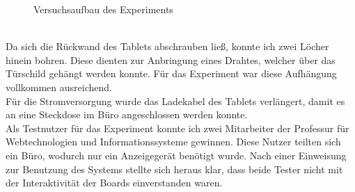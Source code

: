 \begin{figure}[h!]
  \centering
  \caption{Versuchsaufbau des Experiments}
  \label{img:Versuchsaufbau}
\end{figure}
\\
Da sich die Rückwand des Tablets abschrauben ließ, konnte ich zwei Löcher hinein bohren. Diese dienten zur Anbringung eines Drahtes, welcher über das Türschild gehängt werden konnte. Für das Experiment war diese Aufhängung vollkommen ausreichend.
\\
Für die Stromversorgung wurde das Ladekabel des Tablets verlängert, damit es an eine Steckdose im Büro angeschlossen werden konnte.
\\
Als Testnutzer für das Experiment konnte ich zwei Mitarbeiter der Professur für Webtechnologien und Informationssysteme gewinnen.
Diese Nutzer teilten sich ein Büro, wodurch nur ein Anzeigegerät benötigt wurde.
Nach einer Einweisung zur Benutzung des Systems stellte sich heraus klar, dass beide Tester nicht mit der Interaktivität der Boards einverstanden waren.
